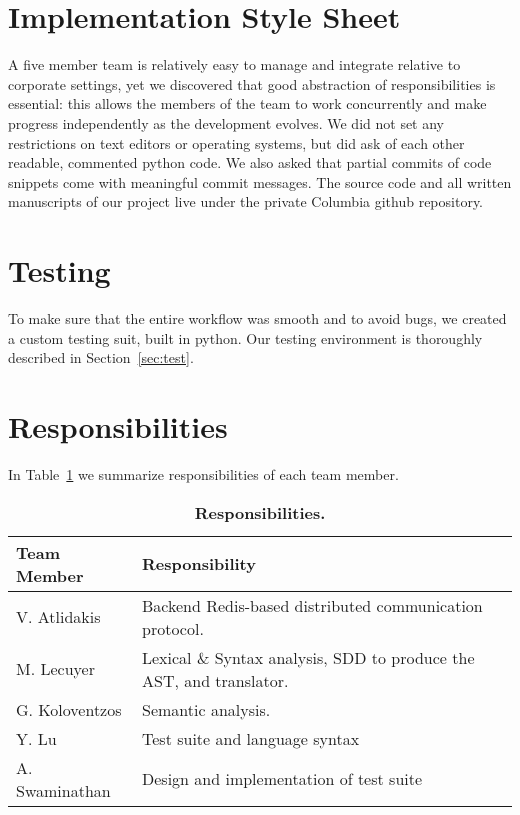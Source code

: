 \section{Implementation Style Sheet}
A five member team is relatively easy to manage and integrate relative to
corporate settings, yet we discovered that good abstraction of responsibilities
is essential: this allows the members of the team to work concurrently and make
progress independently as the development evolves.  We did not set any
restrictions on text editors or operating systems, but did ask of each other
readable, commented python code. We also asked that partial commits of
code snippets come with meaningful commit messages. The source code and all
written manuscripts of our project live under the private Columbia github
repository.

\section{Testing}
To make sure that the entire workflow was smooth and to avoid bugs, we created
a
custom testing suit, built in python. Our testing environment is thoroughly
described in Section~\ref{sec:test}.

\section{Responsibilities}
In Table~\ref{tab:resp} we summarize responsibilities of each team member.
\begin{table}[!h]
{%
 \begin{center}
    \begin{tabular}{ | l || l |}
    \hline
    \textbf{Team Member} & \textbf{Responsibility} \\
    \hline
    \hline
    V. Atlidakis & Backend Redis-based distributed communication protocol.\\ \hline
    M. Lecuyer & Lexical \& Syntax analysis, SDD to produce the AST, and translator. \\ \hline
    G. Koloventzos & Semantic analysis. \\ \hline
    Y. Lu & Test suite and language syntax \\ \hline
    A. Swaminathan  & Design and implementation of test suite \\ \hline
    \hline
    \end{tabular}
    \caption{\textbf{Responsibilities.}}
    \label{tab:resp}
 \end{center}
}
\end{table}


